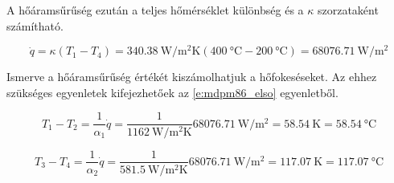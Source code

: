 \noindent A hőáramsűrűség ezután a teljes hőmérséklet különbség és a $\kappa$ szorzataként számítható.

\begin{equation}
\dot{q}=\kappa(T_1-T_4)=\SI{340,38}{\watt\per\meter\squared\kelvin}(\SI{400}{\degreeCelsius}-\SI{200}{\degreeCelsius})=\SI{68076,71}{\watt\per\meter\squared}
\end{equation}

\noindent Ismerve a hőáramsűrűség értékét kiszámolhatjuk a hőfokeséseket. Az ehhez szükséges egyenletek kifejezhetőek az \ref{e:mdpm86_elso} egyenletből.

\begin{equation}
T_1-T_2=\dfrac{1}{\alpha_1}\dot{q}=\dfrac{1}{\SI{1162}{\watt\per\meter\squared\kelvin}}\SI{68076,71}{\watt\per\meter\squared}=\SI{58,54}{\kelvin}=\SI{58,54}{\degreeCelsius}
\end{equation}

\begin{equation}
T_3-T_4=\dfrac{1}{\alpha_2}\dot{q}=\dfrac{1}{\SI{581,5}{\watt\per\meter\squared\kelvin}}\SI{68076,71}{\watt\per\meter\squared}=\SI{117,07}{\kelvin}=\SI{117,07}{\degreeCelsius}
\end{equation}
